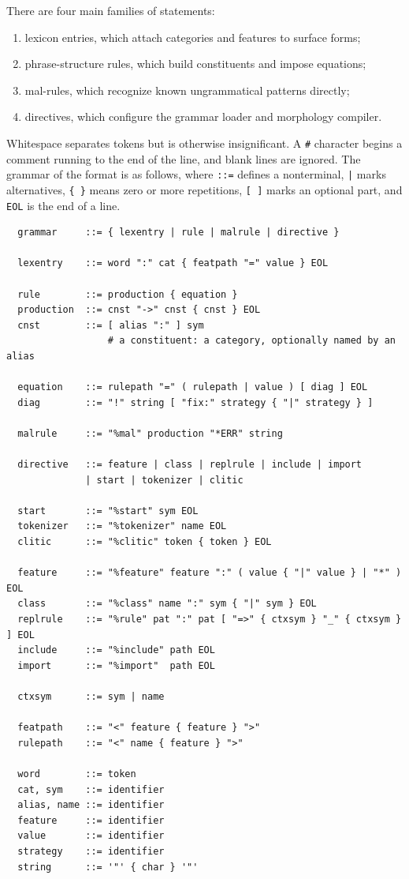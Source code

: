 \documentclass[11pt]{article}
\theoremstyle{definition}
\theoremstyle{plain}
\theoremstyle{remark}
\begin{document}
There are four main families of statements:
\begin{enumerate}
  \item lexicon entries, which attach categories and features to surface forms;
  \item phrase-structure rules, which build constituents and impose equations;
  \item mal-rules, which recognize known ungrammatical patterns directly;
  \item directives, which configure the grammar loader and morphology compiler.
\end{enumerate}

Whitespace separates tokens but is otherwise insignificant. A \texttt{\#}
character begins a comment running to the end of the line, and blank lines are
ignored. The grammar of the format is as follows, where \texttt{::=} defines a
nonterminal, \texttt{|} marks alternatives, \texttt{\{\,\}} means zero or more
repetitions, \texttt{[\,]} marks an optional part, and \texttt{EOL} is the end
of a line.

\begin{verbatim}
  grammar     ::= { lexentry | rule | malrule | directive }

  lexentry    ::= word ":" cat { featpath "=" value } EOL

  rule        ::= production { equation }
  production  ::= cnst "->" cnst { cnst } EOL
  cnst        ::= [ alias ":" ] sym
                  # a constituent: a category, optionally named by an alias

  equation    ::= rulepath "=" ( rulepath | value ) [ diag ] EOL
  diag        ::= "!" string [ "fix:" strategy { "|" strategy } ]

  malrule     ::= "%mal" production "*ERR" string

  directive   ::= feature | class | replrule | include | import
              | start | tokenizer | clitic

  start       ::= "%start" sym EOL
  tokenizer   ::= "%tokenizer" name EOL
  clitic      ::= "%clitic" token { token } EOL

  feature     ::= "%feature" feature ":" ( value { "|" value } | "*" ) EOL
  class       ::= "%class" name ":" sym { "|" sym } EOL
  replrule    ::= "%rule" pat ":" pat [ "=>" { ctxsym } "_" { ctxsym } ] EOL
  include     ::= "%include" path EOL
  import      ::= "%import"  path EOL

  ctxsym      ::= sym | name

  featpath    ::= "<" feature { feature } ">"
  rulepath    ::= "<" name { feature } ">"

  word        ::= token
  cat, sym    ::= identifier
  alias, name ::= identifier
  feature     ::= identifier
  value       ::= identifier
  strategy    ::= identifier
  string      ::= '"' { char } '"'
\end{verbatim}
\end{document}
